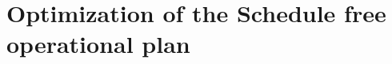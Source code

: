 \documentclass[12pt]{elsarticle}
\begin{document}
%
%
%
%
%
%
%
%
%
%



\section{Optimization of the Schedule free operational plan}
\end{document}

